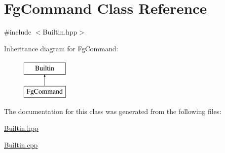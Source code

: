 \hypertarget{classFgCommand}{
\section{FgCommand Class Reference}
\label{classFgCommand}
}


{\ttfamily \#include $<$Builtin.hpp$>$}

Inheritance diagram for FgCommand:\begin{figure}[H]
\begin{center}
\leavevmode
\includegraphics[height=2.000000cm]{classFgCommand}
\end{center}
\end{figure}


The documentation for this class was generated from the following files:\begin{DoxyCompactItemize}
\item 
\hyperlink{Builtin_8hpp}{Builtin.hpp}\item 
\hyperlink{Builtin_8cpp}{Builtin.cpp}\end{DoxyCompactItemize}

